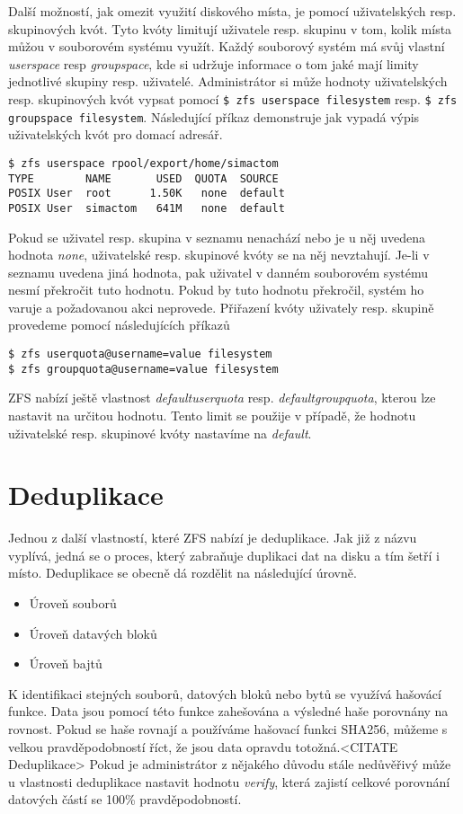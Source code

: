 Další možností, jak omezit využití diskového místa, je pomocí uživatelských resp. skupinových kvót. Tyto kvóty limitují uživatele resp. skupinu v tom, kolik místa můžou v souborovém systému využít. Každý souborový systém má svůj vlastní \emph{userspace} resp \emph{groupspace}, kde si udržuje informace o tom jaké mají limity jednotlivé skupiny resp. uživatelé.
Administrátor si může hodnoty uživatelských resp. skupinových kvót vypsat pomocí \verb|$ zfs userspace filesystem| resp. \verb|$ zfs groupspace filesystem|. Následující příkaz demonstruje jak vypadá výpis uživatelských kvót pro domací adresář.
\begin{verbatim}
$ zfs userspace rpool/export/home/simactom
TYPE        NAME       USED  QUOTA  SOURCE
POSIX User  root      1.50K   none  default
POSIX User  simactom   641M   none  default
\end{verbatim}

Pokud se uživatel resp. skupina v seznamu nenachází nebo je u něj uvedena hodnota \emph{none}, uživatelské resp. skupinové kvóty se na něj nevztahují. Je-li v seznamu uvedena jiná hodnota, pak uživatel v danném souborovém systému nesmí překročit tuto hodnotu. Pokud by tuto hodnotu překročil, systém ho varuje a požadovanou akci neprovede. Přiřazení kvóty uživately resp. skupině provedeme pomocí následujících příkazů
\begin{verbatim}
$ zfs userquota@username=value filesystem
$ zfs groupquota@username=value filesystem
\end{verbatim}

ZFS nabízí ještě vlastnost \emph{defaultuserquota} resp. \emph{defaultgroupquota}, kterou lze nastavit na určitou hodnotu. Tento limit se použije v případě, že hodnotu uživatelské resp. skupinové kvóty nastavíme na \emph{default}.
\section{Deduplikace}
\label{dedup}
Jednou z další vlastností, které ZFS nabízí je deduplikace. Jak již z názvu vyplívá, jedná se o proces, který zabraňuje duplikaci dat na disku a tím šetří i místo. Deduplikace se obecně dá rozdělit na následující úrovně.
\begin{itemize}
  \item Úroveň souborů
  \item Úroveň datavých bloků
  \item Úroveň bajtů
\end{itemize}

K identifikaci stejných souborů, datových bloků nebo bytů se využívá hašovácí funkce. Data jsou pomocí této funkce zahešována a výsledné haše porovnány na rovnost. Pokud se haše rovnají a používáme hašovací funkci SHA256, můžeme s velkou pravděpodobností říct, že jsou data opravdu totožná.<CITATE Deduplikace> Pokud je administrátor z nějakého důvodu stále nedůvěřivý může u vlastnosti deduplikace nastavit hodnotu \emph{verify}, která zajistí celkové porovnání datových částí se 100\% pravděpodobností.

